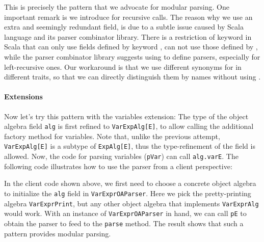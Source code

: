 This is precisely the pattern that we advocate for modular parsing.
One important remark is we introduce  for recursive calls.
The reason why we use an extra and seemingly redundant field, is due to a subtle issue caused by Scala language and its parser combinator library. There is a restriction of  keyword in Scala that  can only use fields defined by keyword , can not use those defined by , while the parser combinator library suggests using  to define parsers, especially for left-recursive ones. Our workaround is that we use different synonyms for  in different traits, so that we can directly distinguish them by names without using .

\paragraph{Extensions}
Now let's try this pattern with the variables extension:
\noindent The type of the object algebra field \lstinline{alg} is first refined
to \lstinline{VarExpAlg[E]}, to allow calling the additional factory method
for variables. Note that, unlike the previous attempt, \lstinline{VarExpAlg[E]}
is a subtype of \lstinline{ExpAlg[E]}, thus the type-refinement of the
field is allowed. Now, the code for parsing variables (\lstinline{pVar}) can
call \lstinline{alg.varE}. The following code illustrates how to use
the parser from a client perspective:


In the client code shown above, we first need to choose a concrete
object algebra to initialize the \lstinline{alg} field in \lstinline{VarExprOAParser}. Here we pick the
pretty-printing algebra \lstinline{VarExprPrint}, but any other object
algebra that implements \lstinline{VarExprAlg} would work.
With an instance of \lstinline{VarExprOAParser} in hand, we can call
\lstinline{pE} to obtain the parser to feed to the \lstinline{parse} method.
The result shows that such a pattern provides modular parsing.

